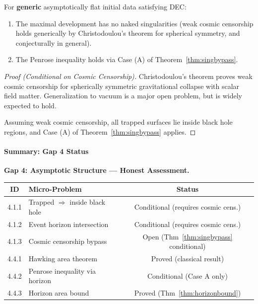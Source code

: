 \begin{theorem}\label{thm:generic}
For \textbf{generic} asymptotically flat initial data satisfying DEC:
\begin{enumerate}
    \item The maximal development has no naked singularities (weak cosmic censorship holds generically by Christodoulou's theorem for spherical symmetry, and conjecturally in general).
    \item The Penrose inequality holds via Case (A) of Theorem~\ref{thm:singbypass}.
\end{enumerate}
\end{theorem}

\begin{proof}[Proof (Conditional on Cosmic Censorship)]
Christodoulou's theorem \cite{christodoulou1999} proves weak cosmic censorship for spherically symmetric gravitational collapse with scalar field matter. Generalization to vacuum is a major open problem, but is widely expected to hold.

Assuming weak cosmic censorship, all trapped surfaces lie inside black hole regions, and Case (A) of Theorem~\ref{thm:singbypass} applies.
\end{proof}

\paragraph{Summary: Gap 4 Status}

\textbf{Gap 4: Asymptotic Structure --- Honest Assessment.}
\begin{center}
\begin{tabular}{|c|l|c|}
\hline
\textbf{ID} & \textbf{Micro-Problem} & \textbf{Status} \\
\hline
4.1.1 & Trapped $\Rightarrow$ inside black hole & Conditional (requires cosmic cens.) \\
4.1.2 & Event horizon intersection & Conditional (requires cosmic cens.) \\
4.1.3 & Cosmic censorship bypass & Open (Thm~\ref{thm:singbypass} conditional) \\
4.4.1 & Hawking area theorem & Proved (classical result) \\
4.4.2 & Penrose inequality via horizon & Conditional (Case A only) \\
4.4.3 & Horizon area bound & Proved (Thm~\ref{thm:horizonbound}) \\
\hline
\end{tabular}
\end{center}

